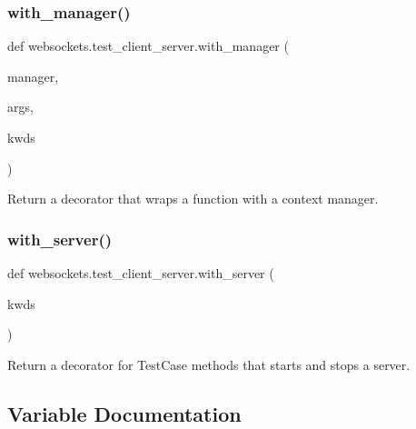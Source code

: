 \subsubsection{\texorpdfstring{with\+\_\+manager()}{with\_manager()}}
{\footnotesize\ttfamily def websockets.\+test\+\_\+client\+\_\+server.\+with\+\_\+manager (\begin{DoxyParamCaption}\item[{}]{manager,  }\item[{}]{args,  }\item[{}]{kwds }\end{DoxyParamCaption})}

\begin{DoxyVerb}Return a decorator that wraps a function with a context manager.\end{DoxyVerb}
 \mbox{\label{namespacewebsockets_1_1test__client__server_adc2855159c14026d788f17b470161818}} 
\subsubsection{\texorpdfstring{with\+\_\+server()}{with\_server()}}
{\footnotesize\ttfamily def websockets.\+test\+\_\+client\+\_\+server.\+with\+\_\+server (\begin{DoxyParamCaption}\item[{}]{kwds }\end{DoxyParamCaption})}

\begin{DoxyVerb}Return a decorator for TestCase methods that starts and stops a server.\end{DoxyVerb}
 

\subsection{Variable Documentation}
\mbox{\label{namespacewebsockets_1_1test__client__server_a4fb235df1ed9e88ae3be1848265c69dc}} 
